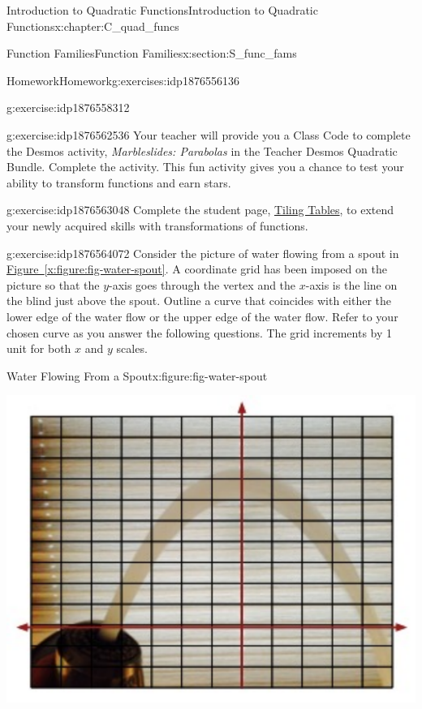 \documentclass[oneside,10pt,]{book}
\newcommand{\xreffont}{\relax}
\newcommand{\pubtitle}[1]{\textsl{#1}}
\numberwithin{equation}{chapter}
\begin{document}
\begin{chapterptx}{Introduction to Quadratic Functions}{}{Introduction to Quadratic Functions}{}{}{x:chapter:C_quad_funcs}
\begin{sectionptx}{Function Families}{}{Function Families}{}{}{x:section:S_func_fams}
\begin{exercises-subsection}{Homework}{}{Homework}{}{}{g:exercises:idp1876556136}
\begin{divisionexercise}{1}{}{}{g:exercise:idp1876558312}
\end{divisionexercise}%
\begin{divisionexercise}{2}{}{}{g:exercise:idp1876562536}%
Your teacher will provide you a Class Code to complete the Desmos activity, \pubtitle{Marbleslides: Parabolas} in the Teacher Desmos Quadratic Bundle. Complete the activity. This fun activity gives you a chance to test your ability to transform functions and earn stars.%
\end{divisionexercise}%
\begin{divisionexercise}{3}{}{}{g:exercise:idp1876563048}%
Complete the student page, \hyperref[x:worksheet:act-tile-tables]{Tiling Tables}, to extend your newly acquired skills with transformations of functions.%
\end{divisionexercise}%
\begin{divisionexercise}{4}{}{}{g:exercise:idp1876564072}%
Consider the picture of water flowing from a spout in \hyperref[x:figure:fig-water-spout]{Figure~{\xreffont\ref{x:figure:fig-water-spout}}}. A coordinate grid has been imposed on the picture so that the \(y\)-axis goes through the vertex and the \(x\)-axis is the line on the blind just above the spout. Outline a curve that coincides with either the lower edge of the water flow or the upper edge of the water flow. Refer to your chosen curve as you answer the following questions. The grid increments by 1 unit for both \(x\) and \(y\) scales.%
\begin{figureptx}{Water Flowing From a Spout}{x:figure:fig-water-spout}{}%
\begin{image}{0.2}{0.6}{0.2}%
\includegraphics[width=\linewidth]{external/water-spout.pdf}

\end{image}
\end{figureptx}
\end{divisionexercise}
\end{exercises-subsection}
\end{sectionptx}
\end{chapterptx}
\end{document}
